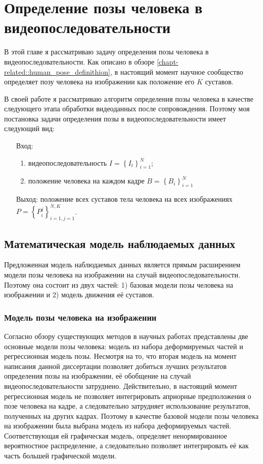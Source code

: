 \chapter{Определение позы человека в видеопоследовательности} \label{chapt6}

В этой главе я рассматриваю задачу определения позы человека в видеопоследовательности. Как описано в обзоре \ref{chapt-related::human_pose_definithion}, в настоящий момент научное сообщество определяет позу человека на изображении как положение его $K$ суставов.

В своей работе я рассматриваю алгоритм определения позы человека в качестве следующего этапа обработки видеоданных после сопровождения. Поэтому моя постановка задачи определения позы в видеопоследовательности имеет следующий вид:
\begin{itemize}
	\item[Вход:] 
	\begin{enumerate}
		\item видеопоследовательность $I=\left\{I_t\right\}_{i=1}^N$;
		\item положение человека на каждом кадре $B=\left\{B_i\right\}_{i=1}^N$
	\end{enumerate}
	\item[Выход:] положение всех суставов тела человека на всех изображениях $P=\left\{P_i^j\right\}_{i=1,j=1}^{N,K}$.
\end{itemize}

\section{Математическая модель наблюдаемых данных}

Предложенная модель наблюдаемых данных является прямым расширением модели позы человека на изображении на случай видеопоследовательности. Поэтому она состоит из двух частей: 1) базовая модели позы человека на изображении и 2) модель движения её суставов.

\subsection{Модель позы человека на изображении}

Согласно обзору существующих методов в научных работах представлены две основные модели позы человека: модель из набора деформируемых частей и регрессионная модель позы. Несмотря на то, что вторая модель на момент написания данной диссертации позволяет добиться лучших результатов определения позы на изображении, её обобщение на случай видеопоследовательности затруднено. Действительно, в настоящий момент регрессионная модель не позволяет интегрировать априорные предположения о позе человека на кадре, а следовательно затрудняет использование результатов, полученных на других кадрах. Поэтому в качестве базовой модели позы человека на изображении была выбрана модель из набора деформируемых частей. Соответствующая ей графическая модель, определяет ненормированное вероятностное распределение, а следовательно позволяет интегрировать её как часть большей графической модели.



